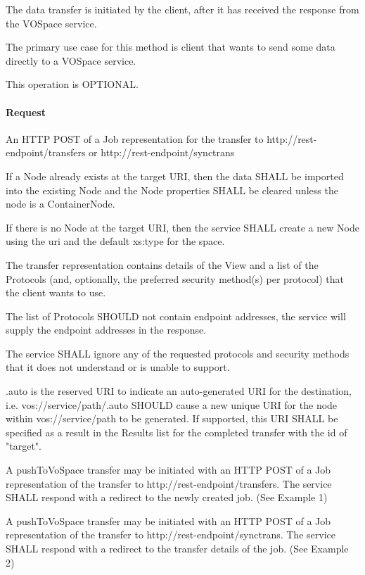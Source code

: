\documentclass[11pt,a4paper]{ivoa}
\begin{document}
The data transfer is initiated by the client, after it has received the response from the VOSpace service.

The primary use case for this method is client that wants to send some data directly to a VOSpace service.

This operation is OPTIONAL.

\paragraph{Request}
An HTTP POST of a Job representation for the transfer to http://rest-endpoint/transfers or http://rest-endpoint/synctrans

If a Node already exists at the target URI, then the data SHALL be imported into the existing Node and the Node properties SHALL be cleared unless the node is a ContainerNode.

If there is no Node at the target URI, then the service SHALL create a new Node using the uri and the default xs:type for the space.

The transfer representation contains details of the View and a list of the Protocols (and, optionally, the preferred security method(s) per protocol) that the client wants to use.

The list of Protocols SHOULD not contain endpoint addresses, the service will supply the endpoint addresses in the response.

The service SHALL ignore any of the requested protocols and security methods that it does not understand or is unable to support.

.auto is the reserved URI to indicate an auto-generated URI for the destination, i.e. vos://service/path/.auto SHOULD cause a new unique URI for the node within vos://service/path to be generated.  If supported, this URI SHALL be specified as a result in the Results list for the completed transfer with the id of "target".

A pushToVoSpace transfer may be initiated with an HTTP POST of a Job representation of the transfer to http://rest-endpoint/transfers. The service SHALL respond with a redirect to the newly created job.  (See Example 1)

A pushToVoSpace transfer may be initiated with an HTTP POST of a Job representation of the transfer to http://rest-endpoint/synctrans. The service SHALL respond with a redirect to the transfer details of the job.  (See Example 2)
\end{document}
